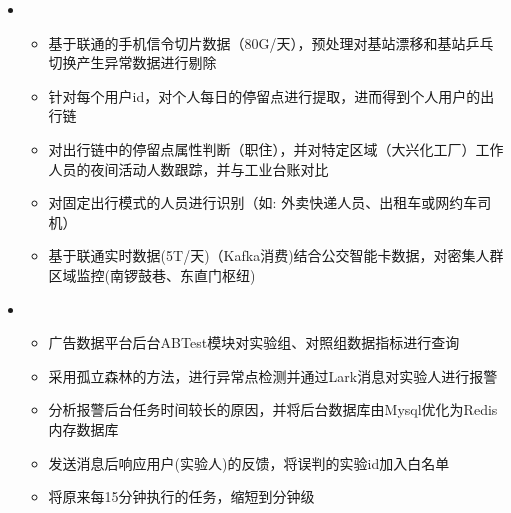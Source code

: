 \begin{itemize}[leftmargin=*]
    \item 
      {\small
      \begin{itemize}
        \item 基于联通的手机信令切片数据（80G/天），预处理对基站漂移和基站乒乓切换产生异常数据进行剔除
        \item 针对每个用户id，对个人每日的停留点进行提取，进而得到个人用户的出行链
        \item 对出行链中的停留点属性判断（职住），并对特定区域（大兴化工厂）工作人员的夜间活动人数跟踪，并与工业台账对比
        \item 对固定出行模式的人员进行识别（如: 外卖快递人员、出租车或网约车司机）
        \item 基于联通实时数据(5T/天)（Kafka消费)结合公交智能卡数据，对密集人群区域监控(南锣鼓巷、东直门枢纽)
      \end{itemize}

      }
    \item 
      {\small
      \begin{itemize}
        \item 广告数据平台后台ABTest模块对实验组、对照组数据指标进行查询
        \item 采用孤立森林的方法，进行异常点检测并通过Lark消息对实验人进行报警
        \item 分析报警后台任务时间较长的原因，并将后台数据库由Mysql优化为Redis内存数据库
        \item 发送消息后响应用户(实验人)的反馈，将误判的实验id加入白名单
        \item 将原来每15分钟执行的任务，缩短到分钟级
      \end{itemize} 
      }
  \end{itemize}